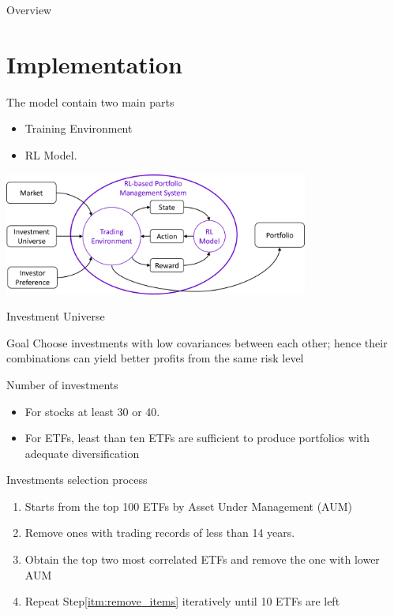 \begin{frame}{Overview}
\section{Implementation}
The model contain two main parts
\begin{itemize}
    \item Training Environment
    \item RL Model. 
\end{itemize}
\begin{center}
  \includegraphics[width=10cm]{images/context_diagram.png}  
\end{center}
\end{frame}

\begin{frame}{Investment Universe}
\begin{block}{Goal}
Choose investments with low covariances between each other; hence their combinations can yield better profits from the same risk level
\end{block}
\par
\begin{block}{Number of investments}
\begin{itemize}
\item For stocks at least 30 or 40.

\item For ETFs, least than ten ETFs are sufficient to produce portfolios with adequate diversification
\end{itemize}
\end{block}

\end{frame}


\begin{frame}{Investments selection process}
    \begin{enumerate}
    \item Starts from the top 100 ETFs by Asset Under Management (AUM)
    \item Remove ones with trading records of less than 14 years.
    \item \label{itm:remove_items} Obtain the top two most correlated ETFs and remove the one with lower AUM
    \item Repeat Step\ref{itm:remove_items} iteratively until 10 ETFs are left
    \end{enumerate}
\end{frame}

